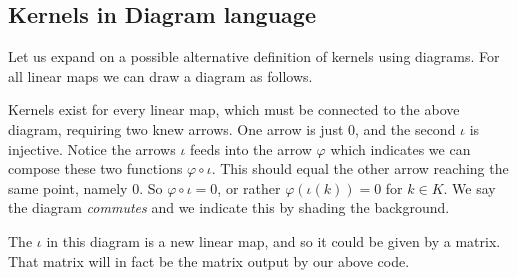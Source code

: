 \documentclass[12pt,twoside,dvipsnames,letterpaper]{memoir}
\begin{document}
\subsection{Kernels in Diagram language}
Let us expand on a possible alternative definition of kernels 
using diagrams.  For all linear maps we can draw a diagram as follows.
\begin{center}
\end{center}
Kernels exist for every linear map, which must be connected 
to the above diagram, requiring two knew arrows.  One arrow is 
just $0$, and the second $\iota$ is injective.  Notice the arrows 
$\iota$ feeds into the arrow $\varphi$ which indicates we can compose 
these two functions $\varphi\circ \iota$.  This should equal the other 
arrow reaching the same point, namely $0$.  So $\varphi\circ \iota=0$,
or rather $\varphi(\iota(k))=0$ for $k\in K$.  We say the 
diagram \emph{commutes} and we indicate this by shading the background.
\begin{center}
\end{center}
The $\iota$ in this diagram is a new linear map, and so it could be 
given by a matrix.  That matrix will in fact be the matrix output by 
our above code.
\end{document}
